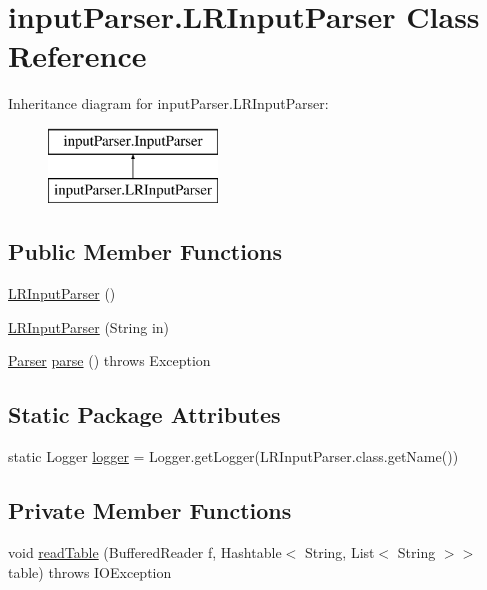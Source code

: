 \hypertarget{classinput_parser_1_1_l_r_input_parser}{\section{input\-Parser.\-L\-R\-Input\-Parser Class Reference}
\label{classinput_parser_1_1_l_r_input_parser}
}
Inheritance diagram for input\-Parser.\-L\-R\-Input\-Parser\-:\begin{figure}[H]
\begin{center}
\leavevmode
\includegraphics[height=2.000000cm]{classinput_parser_1_1_l_r_input_parser}
\end{center}
\end{figure}
\subsection*{Public Member Functions}
\begin{DoxyCompactItemize}
\item 
\hyperlink{classinput_parser_1_1_l_r_input_parser_a243ff5c225bbbe63bc64e615fed97ec4}{L\-R\-Input\-Parser} ()
\item 
\hyperlink{classinput_parser_1_1_l_r_input_parser_a42f9947db4e863a82e3a8ca89c655c2a}{L\-R\-Input\-Parser} (String in)
\item 
\hyperlink{classparser_program_1_1_parser}{Parser} \hyperlink{classinput_parser_1_1_l_r_input_parser_ab1fb2966ece506eead96dcededca86a6}{parse} ()  throws Exception 
\end{DoxyCompactItemize}
\subsection*{Static Package Attributes}
\begin{DoxyCompactItemize}
\item 
static Logger \hyperlink{classinput_parser_1_1_l_r_input_parser_ae3d6e07ebb7d4368f1a2e2ad05dae6f7}{logger} = Logger.\-get\-Logger(L\-R\-Input\-Parser.\-class.\-get\-Name())
\end{DoxyCompactItemize}
\subsection*{Private Member Functions}
\begin{DoxyCompactItemize}
\item 
void \hyperlink{classinput_parser_1_1_l_r_input_parser_a1ade16089652dc354434e1ddb1769e96}{read\-Table} (Buffered\-Reader f, Hashtable$<$ String, List$<$ String $>$$>$ table)  throws I\-O\-Exception 
\end{DoxyCompactItemize}
